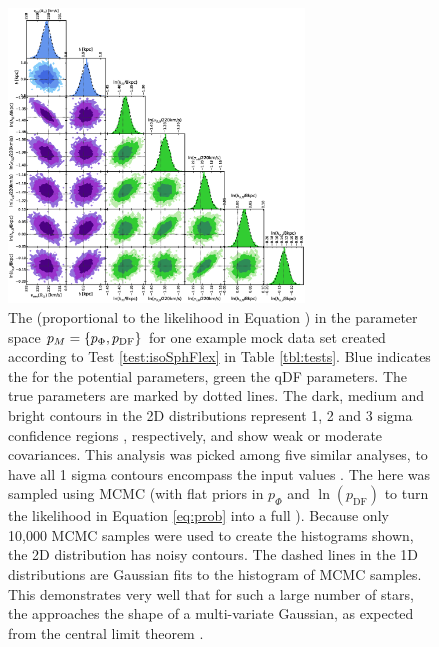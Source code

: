 
\begin{figure}
\centering
\includegraphics[width=0.7\textwidth]{figs/isoSphFlex_short_hot_2kpc_triangle_MCMC.eps}
\caption{The \pdf{} (proportional to the likelihood in Equation \Wilma{[TO DO]}) in the parameter space $p_M{} = \{p_\Phi,p_\text{DF}\}$ for one example mock data set created according to Test \ref{test:isoSphFlex} in Table \ref{tbl:tests}. Blue indicates the \pdf{} for the potential parameters, green the qDF parameters. The true parameters are marked by dotted lines. The dark, medium and bright contours in the 2D distributions represent 1, 2 and 3 sigma confidence regions , respectively, and show weak or moderate covariances. This analysis was picked among five similar analyses, to have all 1 sigma contours encompass the input values . The \pdf{} here was sampled using MCMC (with flat priors in $p_\Phi$ and  $\ln(p_\text{DF})$ to turn the likelihood in Equation \ref{eq:prob} into a full \pdf{}). Because only 10,000 MCMC samples were used to create the histograms shown, the 2D distribution has noisy contours. The dashed lines in the 1D distributions are Gaussian fits to the histogram of MCMC samples. This demonstrates very well that for such a large number of stars, the \pdf{} approaches the shape of a multi-variate Gaussian, as expected from the central limit theorem .}
\label{fig:isoSphFlex_triangleplot}
\end{figure}

